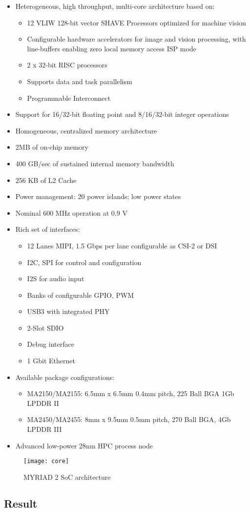 \begin{itemize}
	\item Heterogeneous, high throughput, multi-core architecture based on:
	\begin{itemize}
		\item 12 VLIW 128-bit vector SHAVE Processors optimized for machine vision
		\item Configurable hardware accelerators for image and vision processing, with line-buffers enabling zero local memory access ISP mode
		\item 2 x 32-bit RISC processors 
		\item Supports data and task parallelism 
		\item Programmable Interconnect
		\end{itemize}
		\item Support for 16/32-bit floating point and 8/16/32-bit integer operations
		\item Homogeneous, centralized memory architecture
		\item 2MB of on-chip memory
		\item 400 GB/sec of sustained internal memory bandwidth
		\item 256 KB of L2 Cache
		\item Power management: 20 power islands; low power states
		\item Nominal 600 MHz operation at 0.9 V
		\item Rich set of interfaces:
		\begin{itemize}
			\item 12 Lanes MIPI, 1.5 Gbps per lane configurable as CSI-2 or DSI
			\item I2C, SPI for control and configuration
			\item I2S for audio input
			\item Banks of configurable GPIO, PWM
			\item USB3 with integrated PHY
			\item 2-Slot SDIO
			\item Debug interface
			\item 1 Gbit Ethernet
		\end{itemize}
		\item Available package configurations:
		\begin{itemize}
			\item MA2150/MA2155: 6.5mm x 6.5mm 0.4mm pitch, 225 Ball BGA 1Gb LPDDR II
			\item MA2450/MA2455: 8mm x 9.5mm 0.5mm pitch, 270 Ball BGA, 4Gb LPDDR III
		\end{itemize}
		\item Advanced low-power 28nm HPC process node
\end{itemize}
%
\begin{figure}[htb]
\centering
\texttt{[image: core]}
\caption{MYRIAD 2 SoC architecture}
\label{fig:architecture}
\end{figure}
%
\subsection{Result}
\label{subsection:result}